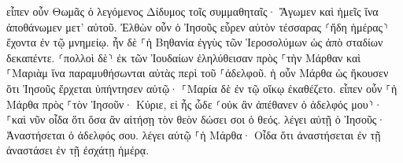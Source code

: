 \documentclass{openreader}
\begin{document}
εἶπεν οὖν Θωμᾶς ὁ λεγόμενος Δίδυμος τοῖς συμμαθηταῖς· Ἄγωμεν καὶ ἡμεῖς ἵνα ἀποθάνωμεν μετ’ αὐτοῦ. 
Ἐλθὼν οὖν ὁ Ἰησοῦς εὗρεν αὐτὸν τέσσαρας ⸂ἤδη ἡμέρας⸃ ἔχοντα ἐν τῷ μνημείῳ. 
ἦν δὲ ⸀ἡ Βηθανία ἐγγὺς τῶν Ἱεροσολύμων ὡς ἀπὸ σταδίων δεκαπέντε. 
⸂πολλοὶ δὲ⸃ ἐκ τῶν Ἰουδαίων ἐληλύθεισαν πρὸς ⸀τὴν Μάρθαν καὶ ⸀Μαριὰμ ἵνα παραμυθήσωνται αὐτὰς περὶ τοῦ ⸀ἀδελφοῦ. 
ἡ οὖν Μάρθα ὡς ἤκουσεν ὅτι Ἰησοῦς ἔρχεται ὑπήντησεν αὐτῷ· ⸀Μαρία δὲ ἐν τῷ οἴκῳ ἐκαθέζετο. 
εἶπεν οὖν ⸀ἡ Μάρθα πρὸς ⸀τὸν Ἰησοῦν· Κύριε, εἰ ἦς ὧδε ⸂οὐκ ἂν ἀπέθανεν ὁ ἀδελφός μου⸃· 
⸀καὶ νῦν οἶδα ὅτι ὅσα ἂν αἰτήσῃ τὸν θεὸν δώσει σοι ὁ θεός. 
λέγει αὐτῇ ὁ Ἰησοῦς· Ἀναστήσεται ὁ ἀδελφός σου. 
λέγει αὐτῷ ⸀ἡ Μάρθα· Οἶδα ὅτι ἀναστήσεται ἐν τῇ ἀναστάσει ἐν τῇ ἐσχάτῃ ἡμέρᾳ. 
\end{document}
